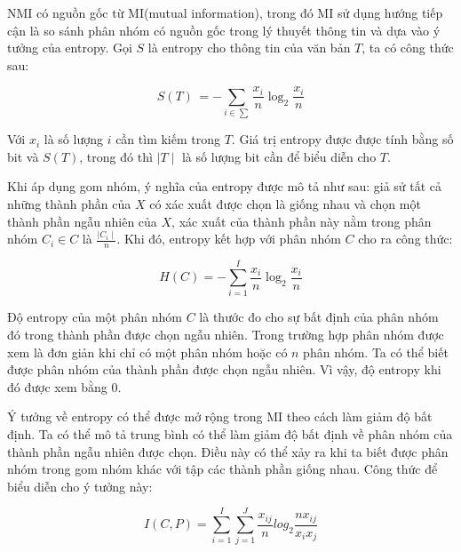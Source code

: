 NMI có nguồn gốc từ MI(mutual information), trong đó MI sử dụng hướng tiếp cận là so sánh phân nhóm có nguồn gốc trong lý thuyết thông tin và dựa vào ý tưởng của entropy.
Gọi $S$ là entropy cho thông tin của văn bản $T$, ta có công thức sau:
\begin{center}
\begin{equation}
S(T) \, = -\sum_{i \in \sum} \frac{x_i}{n} \log_2 \frac{x_i}{n}
\end{equation}
\end{center}

Với $x_i$ là số lượng $i$ cần tìm kiếm trong $T$.
Giá trị entropy được được tính bằng số bit và $S(T)$, trong đó thì $\mid T \mid$ là số lượng bit cần để biểu diễn cho $T$.

Khi áp dụng gom nhóm, ý nghĩa của entropy được mô tả như sau: giả sử tất cả những thành phần của $X$ có xác xuất được chọn là giống nhau và chọn một thành phần ngẫu nhiên của $X$, xác xuất của thành phần này nằm trong phân nhóm $C_i \in C$ là $\frac{\mid C_i \mid}{n}$.
Khi đó, entropy kết hợp với phân nhóm $C$ cho ra công thức:
\begin{center}
\begin{equation}
H (C) = - \sum^{I}_{i = 1} \frac{x_i}{n} \log_2 \frac{x_i}{n}
\end{equation}
\end{center}

Độ entropy của một phân nhóm $C$ là thước đo cho sự bất định của phân nhóm đó trong thành phần được chọn ngẫu nhiên.
Trong trường hợp phân nhóm được xem là đơn giản khi chỉ có một phân nhóm hoặc có $n$ phân nhóm.
Ta có thể biết được phân nhóm của thành phần được chọn ngẫu nhiên.
Vì vậy, độ entropy khi đó được xem bằng $0$.

Ý tưởng về entropy có thể được mở rộng trong MI theo cách làm giảm độ bất định.
Ta có thể mô tả trung bình có thể làm giảm độ bất định về phân nhóm của thành phần ngẫu nhiên được chọn.
Điều này có thể xảy ra khi ta biết được phân nhóm trong gom nhóm khác với tập các thành phần giống nhau.
Công thức để biểu diễn cho ý tưởng này:
\begin{center}
\begin{equation}
I (C, P) = \sum_{i=1}^I \sum_{j=1}^J \frac{x_{ij}}{n} log_2 \frac{n x_{ij}}{x_i x_j}
\end{equation}
\end{center}

